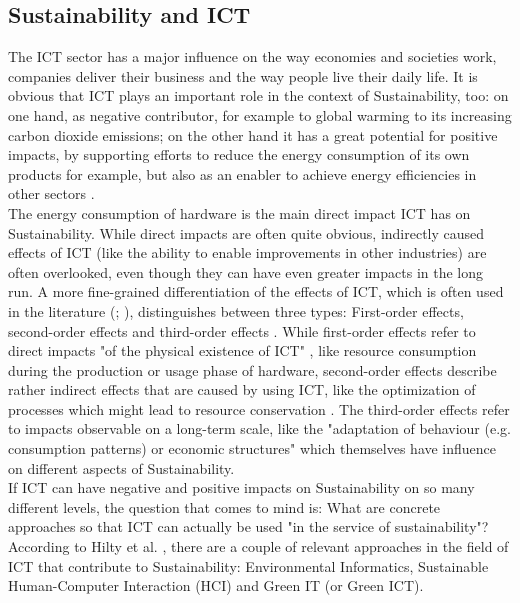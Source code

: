 \documentclass[oribibl]{llncs}
\begin{document}
\subsection{Sustainability and ICT}
The ICT sector has a major influence on the way economies and societies work, companies deliver their business and the way people live their daily life. It is obvious that ICT plays an important role in the context of Sustainability, too: on one hand, as negative contributor, for example to global warming to its increasing carbon dioxide emissions; on the other hand it has a great potential for positive impacts, by supporting efforts to reduce the energy consumption of its own products for example, but also as an enabler to achieve energy efficiencies in other sectors \cite{smart2020}.\\
The energy consumption of hardware is the main direct impact ICT has on Sustainability. While direct impacts are often quite obvious, indirectly caused effects of ICT (like the ability to enable improvements in other industries) are often overlooked, even though they can have even greater impacts in the long run. A more fine-grained differentiation of the effects of ICT, which is often used in the literature (\cite{hilty_relevance_2006}; \cite{naumann_greensoft_2011}), distinguishes between three types: First-order effects, second-order effects and third-order effects \cite{berkhout_impacts_2001}. While first-order effects refer to direct impacts "of the physical existence of ICT" \cite{hilty_relevance_2006}, like resource consumption during the production or usage phase of hardware, second-order effects describe rather indirect effects that are caused by using ICT, like the optimization of processes which might lead to resource conservation \cite{naumann_greensoft_2011}. The third-order effects refer to impacts observable on a long-term scale, like the "adaptation of behaviour (e.g. consumption patterns) or economic structures" \cite{hilty_relevance_2006} which themselves have influence on different aspects of Sustainability.\\  
If ICT can have negative and positive impacts on Sustainability on so many different levels, the question that comes to mind is: What are concrete approaches so that ICT can actually be used "in the service of sustainability"\cite[p.\,5]{hilty11}? According to Hilty et al. \cite{hilty11}, there are a couple of relevant approaches in the field of ICT that contribute to Sustainability: Environmental Informatics, Sustainable Human-Computer Interaction (HCI) and Green IT (or Green ICT). %
\end{document}
